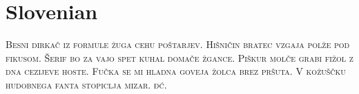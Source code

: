 

\presection\section*{\checkyes Slovenian}\postsection

\noindent\textsc{Besni dirkač iz formule žuga cehu poštarjev.
Hišničin bratec vzgaja polže pod fikusom.
Šerif bo za vajo spet kuhal domače žgance.
Piškur molče grabi fižol z dna cezijeve hoste.
Fučka se mi hladna goveja žolca brez pršuta.
V kožuščku hudobnega fanta stopiclja mizar. đć.}
